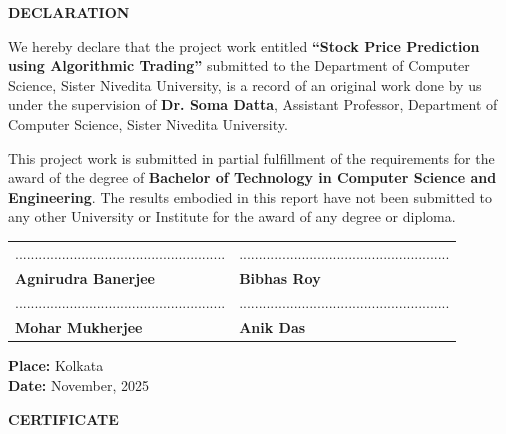 \documentclass[12pt,a4paper]{article}
\begin{document}
\setcounter{page}{1}

\newpage
\begin{center}
    \vspace*{1cm}
    {\Large \bfseries \color{titlecolor} DECLARATION}
    \vspace{1cm}
\end{center}

\noindent We hereby declare that the project work entitled \textbf{``Stock Price Prediction using Algorithmic Trading''} submitted to the Department of Computer Science, Sister Nivedita University, is a record of an original work done by us under the supervision of \textbf{Dr. Soma Datta}, Assistant Professor, Department of Computer Science, Sister Nivedita University.

\vspace{0.5cm}
\noindent This project work is submitted in partial fulfillment of the requirements for the award of the degree of \textbf{Bachelor of Technology in Computer Science and Engineering}. The results embodied in this report have not been submitted to any other University or Institute for the award of any degree or diploma.

\vspace{2cm}

\begin{table}[h]
    \centering
    \begin{tabular}{p{6cm} p{6cm}}
        ...................................................... & ...................................................... \\
        \textbf{Agnirudra Banerjee} & \textbf{Bibhas Roy} \\[1cm]
        
        ...................................................... & ...................................................... \\
        \textbf{Mohar Mukherjee} & \textbf{Anik Das} \\
    \end{tabular}
\end{table}

\vspace{1cm}
\noindent \textbf{Place:} Kolkata \\
\noindent \textbf{Date:} November, 2025

\newpage
\begin{center}
    \vspace*{1cm}
    {\Large \bfseries \color{titlecolor} CERTIFICATE}
    \vspace{1cm}
\end{center}
\end{document}

